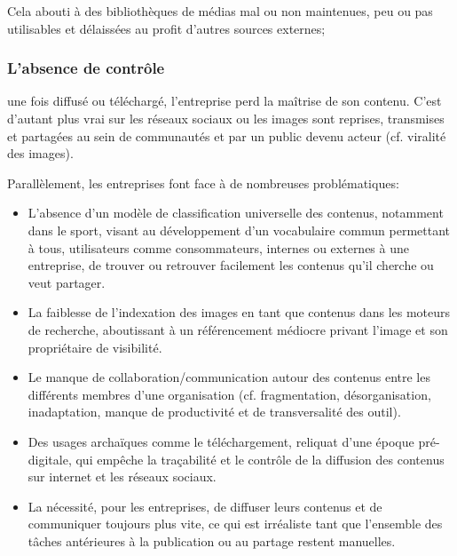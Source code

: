 Cela abouti
à des bibliothèques de médias mal ou non maintenues, peu ou pas utilisables et délaissées au profit
d’autres sources externes;
\newline

\newpage
\subsubsection{L’absence de contrôle} {}
 une fois diffusé ou téléchargé, l’entreprise perd la maîtrise de son contenu. C’est d’autant plus vrai sur les réseaux sociaux ou les images sont reprises, transmises et
partagées au sein de communautés et par un public devenu acteur (cf. viralité des images).

Parallèlement, les entreprises font face à de nombreuses problématiques:\newline

\begin{itemize}
\item  L’absence d’un modèle de classification universelle des contenus, notamment dans le sport, visant
au développement d’un vocabulaire commun permettant à tous, utilisateurs comme consommateurs,
internes ou externes à une entreprise, de trouver ou retrouver facilement les contenus qu’il cherche
ou veut partager.\newline
\item  La faiblesse de l’indexation des images en tant que contenus dans les moteurs de recherche,
aboutissant à un référencement médiocre privant l’image et son propriétaire de visibilité.\newline
\item  Le manque de collaboration/communication autour des contenus entre les différents membres d’une
organisation (cf. fragmentation, désorganisation, inadaptation, manque de productivité et de
transversalité des outil).\newline
\item  Des usages archaïques comme le téléchargement, reliquat d’une époque pré-digitale, qui empêche la
traçabilité et le contrôle de la diffusion des contenus sur internet et les réseaux sociaux.\newline
\item  La nécessité, pour les entreprises, de diffuser leurs contenus et de communiquer toujours plus vite,
ce qui est irréaliste tant que l’ensemble des tâches antérieures à la publication ou au partage restent
manuelles.
\end{itemize}












